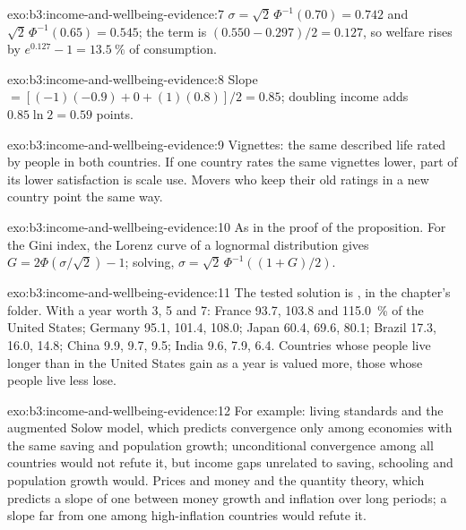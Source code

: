 \begin{solution}{exo:b3:income-and-wellbeing-evidence:7}
$\sigma = \sqrt2\,\Phi^{-1}(0.70) = 0.742$ and $\sqrt2\,\Phi^{-1}(0.65) = 0.545$; the term is $(0.550 - 0.297)/2 = 0.127$, so welfare rises by $e^{0.127} - 1 = 13.5~\%$ of consumption.
\end{solution}

\begin{solution}{exo:b3:income-and-wellbeing-evidence:8}
Slope $= [(-1)(-0.9) + 0 + (1)(0.8)]/2 = 0.85$; doubling income adds $0.85\ln 2 = 0.59$ points.
\end{solution}

\begin{solution}{exo:b3:income-and-wellbeing-evidence:9}
Vignettes: the same described life rated by people in both countries. If one country
rates the same vignettes lower, part of its lower satisfaction is scale use. Movers
who keep their old ratings in a new country point the same way.
\end{solution}

\begin{solution}{exo:b3:income-and-wellbeing-evidence:10}
As in the proof of the proposition. For the Gini index, the Lorenz curve of a lognormal distribution
gives $G = 2\Phi(\sigma/\sqrt2) - 1$; solving, $\sigma = \sqrt2\,\Phi^{-1}((1 + G)/2)$.
\end{solution}

\begin{solution}{exo:b3:income-and-wellbeing-evidence:11}
The tested solution is , in the chapter's 
folder. With a year worth 3, 5 and 7: France 93.7, 103.8 and 115.0~\% of the United States; Germany 95.1, 101.4, 108.0;
Japan 60.4, 69.6, 80.1; Brazil 17.3, 16.0, 14.8; China 9.9, 9.7, 9.5; India 9.6, 7.9, 6.4. Countries whose people live longer than
in the United States gain as a year is valued more, those whose people live less lose. %
\end{solution}

\begin{solution}{exo:b3:income-and-wellbeing-evidence:12}
For example: living standards and the augmented Solow model, which predicts
convergence only among economies with the same saving and population growth;
unconditional convergence among all countries would not refute it, but income gaps
unrelated to saving, schooling and population growth would. Prices and money and the
quantity theory, which predicts a slope of one between money growth and inflation
over long periods; a slope far from one among high-inflation countries would refute it.
\end{solution}

